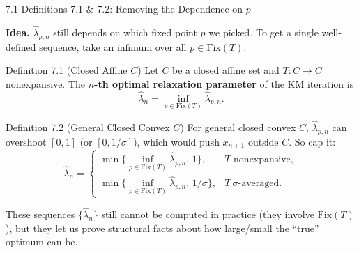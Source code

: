 \documentclass[aspectratio=169,10pt]{beamer}
\newcommand{\Fix}{\mathrm{Fix}}
\begin{document}
\begin{frame}{7.1 Definitions 7.1 \& 7.2: Removing the Dependence on $p$}

  \textbf{Idea.} $\widehat\lambda_{p,n}$ still depends on which fixed
  point $p$ we picked. To get a single well-defined sequence, take
  an infimum over all $p\in\Fix(T)$.

  \begin{block}{Definition 7.1 (Closed Affine $C$)}
    Let $C$ be a closed affine set and $T:C\to C$ nonexpansive. The
    \textbf{$n$-th optimal relaxation parameter} of the KM iteration
    is
    \[
      \widehat\lambda_n = \inf_{p\in\Fix(T)}\widehat\lambda_{p,n}.
    \]
  \end{block}

  \begin{block}{Definition 7.2 (General Closed Convex $C$)}
    For general closed convex $C$, $\widehat\lambda_{p,n}$ can
    overshoot $[0,1]$ (or $[0,1/\sigma]$), which would push $x_{n+1}$
    outside $C$. So cap it:
    \[
      \widehat\lambda_n =
      \begin{cases}
        \min\{\inf_{p\in\Fix(T)}\widehat\lambda_{p,n},\,1\}, & T\text{ nonexpansive},\\
        \min\{\inf_{p\in\Fix(T)}\widehat\lambda_{p,n},\,1/\sigma\}, & T\ \sigma\text{-averaged}.
      \end{cases}
    \]
  \end{block}

  These sequences $\{\widehat\lambda_n\}$ still cannot be computed
  in practice (they involve $\Fix(T)$), but they let us prove
  structural facts about how large/small the ``true'' optimum can be.

\end{frame}
\end{document}
